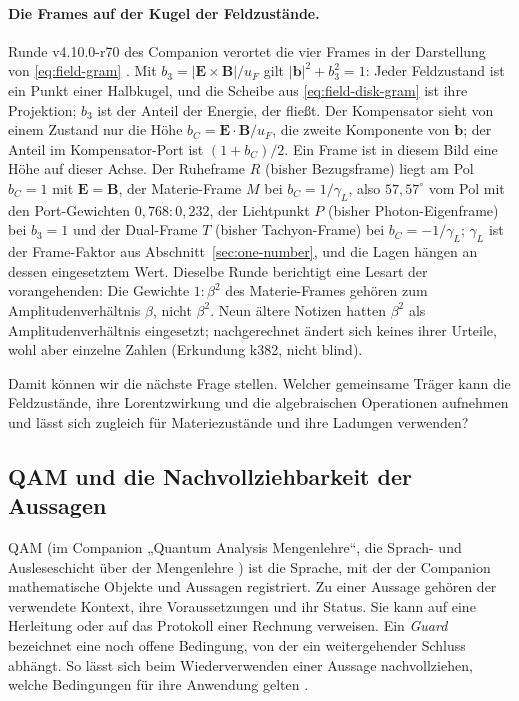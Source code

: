 \paragraph{Die Frames auf der Kugel der Feldzustände.}
Runde v4.10.0-r70 des Companion verortet die vier Frames in der Darstellung von \eqref{eq:field-gram} \cite{layersr69r75}. Mit
\(b_3=|\mathbf E\times\mathbf B|/u_F\) gilt \(|\mathbf b|^2+b_3^2=1\): Jeder Feldzustand ist ein Punkt einer Halbkugel, und die Scheibe aus
\eqref{eq:field-disk-gram} ist ihre Projektion; \(b_3\) ist der Anteil der Energie, der fließt. Der Kompensator sieht von einem Zustand nur
die Höhe \(b_C=\mathbf E\cdot\mathbf B/u_F\), die zweite Komponente von \(\mathbf b\); der Anteil im Kompensator-Port ist \((1+b_C)/2\). Ein
Frame ist in diesem Bild eine Höhe auf dieser Achse. Der Ruheframe \(R\) (bisher Bezugsframe) liegt am Pol \(b_C=1\) mit
\(\mathbf E=\mathbf B\), der Materie-Frame \(M\) bei \(b_C=1/\gamma_L\), also \(57{,}57^\circ\) vom Pol mit den Port-Gewichten
\(0{,}768:0{,}232\), der Lichtpunkt \(P\) (bisher Photon-Eigenframe) bei \(b_3=1\) und der Dual-Frame \(T\) (bisher Tachyon-Frame) bei
\(b_C=-1/\gamma_L\); \(\gamma_L\) ist der Frame-Faktor aus Abschnitt~\ref{sec:one-number}, und die Lagen hängen an dessen eingesetztem Wert.
Dieselbe Runde berichtigt eine Lesart der vorangehenden: Die Gewichte \(1:\beta^2\) des Materie-Frames gehören zum Amplitudenverhältnis
\(\beta\), nicht \(\beta^2\). Neun ältere Notizen hatten \(\beta^2\) als Amplitudenverhältnis eingesetzt; nachgerechnet ändert sich keines ihrer
Urteile, wohl aber einzelne Zahlen (Erkundung k382, nicht blind).

Damit können wir die nächste Frage stellen. Welcher gemeinsame Träger kann die Feldzustände, ihre Lorentzwirkung und die algebraischen Operationen aufnehmen und lässt sich zugleich für Materiezustände und ihre Ladungen verwenden?

\subsection{QAM und die Nachvollziehbarkeit der Aussagen}
\label{sec:qam}

QAM (im Companion „Quantum Analysis Mengenlehre“, die Sprach- und Ausleseschicht über der Mengenlehre \cite{companion}) ist die Sprache, mit der der Companion mathematische Objekte und Aussagen registriert. Zu einer Aussage gehören der verwendete Kontext, ihre Voraussetzungen und ihr Status. Sie kann auf eine Herleitung oder auf das Protokoll einer Rechnung verweisen. Ein \emph{Guard} bezeichnet eine noch offene Bedingung, von der ein weitergehender Schluss abhängt. So lässt sich beim Wiederverwenden einer Aussage nachvollziehen, welche Bedingungen für ihre Anwendung gelten \cite{qam}.

